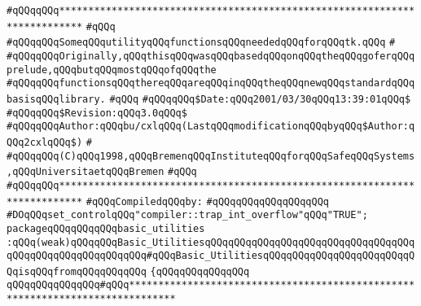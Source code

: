 \label{src/lib/tk/src/basic_util.pkg}
\verb|#qQQqqQQq**************************************************************************|\newline
\verb|#qQQq|\newline
\verb|#qQQqqQQqSomeqQQqutilityqQQqfunctionsqQQqneededqQQqforqQQqtk.qQQq|\newline
\verb|#|\newline
\verb|#qQQqqQQqOriginally,qQQqthisqQQqwasqQQqbasedqQQqonqQQqtheqQQqgoferqQQqprelude,qQQqbutqQQqmostqQQqofqQQqthe|\newline
\verb|#qQQqqQQqfunctionsqQQqthereqQQqareqQQqinqQQqtheqQQqnewqQQqstandardqQQqbasisqQQqlibrary.|\newline
\verb|#qQQq|\newline
\verb|#qQQqqQQq$Date:qQQq2001/03/30qQQq13:39:01qQQq$|\newline
\verb|#qQQqqQQq$Revision:qQQq3.0qQQq$|\newline
\verb|#qQQqqQQqAuthor:qQQqbu/cxlqQQq(LastqQQqmodificationqQQqbyqQQq$Author:qQQq2cxlqQQq$)|\newline
\verb|#|\newline
\verb|#qQQqqQQq(C)qQQq1998,qQQqBremenqQQqInstituteqQQqforqQQqSafeqQQqSystems,qQQqUniversitaetqQQqBremen|\newline
\verb|#qQQq|\newline
\verb|#qQQqqQQq**************************************************************************|\newline
\newline
\verb|#qQQqCompiledqQQqby:|\newline
\verb|#qQQqqQQqqQQqqQQqqQQq|\newline
\newline
\newline
\verb|#DOqQQqset_controlqQQq"compiler::trap_int_overflow"qQQq"TRUE";|\newline
\newline
\verb|packageqQQqqQQqqQQqbasic_utilities|\newline
\verb|:qQQq(weak)qQQqqQQqBasic_UtilitiesqQQqqQQqqQQqqQQqqQQqqQQqqQQqqQQqqQQqqQQqqQQqqQQqqQQqqQQqqQQq#qQQqBasic_UtilitiesqQQqqQQqqQQqqQQqqQQqqQQqqQQqisqQQqfromqQQqqQQqqQQq|\newline
\verb|{qQQqqQQqqQQqqQQq|\newline
\newline
\verb|qQQqqQQqqQQqqQQq#qQQq******************************************************************************|\newline
